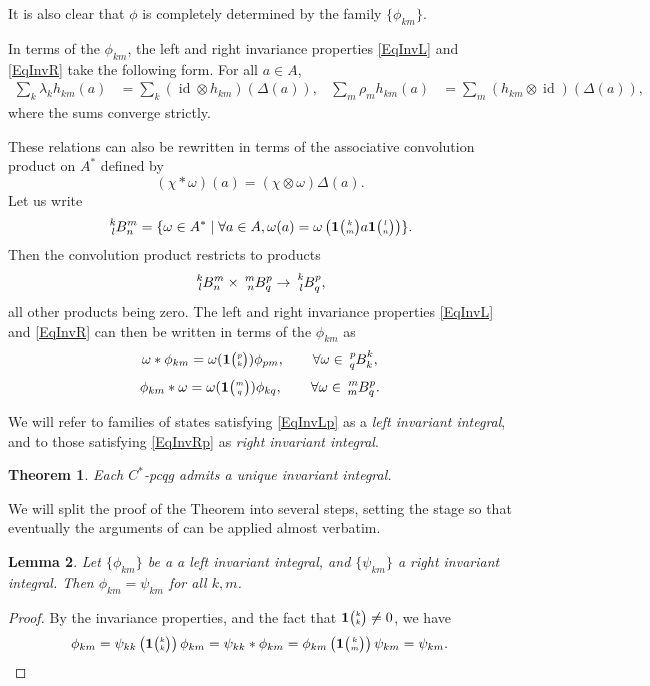 \documentclass[11pt]{article}
\DeclareMathOperator{\id}{id}
\newcommand{\Grt}[3]{#1{\tiny {\begin{pmatrix} #2\\#3\end{pmatrix}}}}
\newcommand{\UnitC}[2]{\Grt{\mathbf{1}}{#1}{#2}}
\newcommand{\Gr}[5]{\,\tensor*[^{#2}_{#4}]{#1}{^{#3}_{#5}}}%
\newtheorem{Theorem}{Theorem}[section]
\newtheorem{Lem}[Theorem]{Lemma}
\theoremstyle{definition}
\numberwithin{equation}{section}
\begin{document}
It is also clear that $\phi$ is completely determined by the family
$\{\phi_{km}\}$.  

In terms of the $\phi_{km}$, the left and right invariance properties
\eqref{EqInvL} and \eqref{EqInvR} take the following form.  For all
$a\in A$,
\begin{align} \label{eq:invariance}
\sum_{k}  \lambda_{k} h_{km}(a) &= \sum_{k}  (\id \otimes
h_{km})(\Delta(a)), &
\sum_{m} \rho_{m} h_{km}(a) &= \sum_{m} (h_{km} \otimes \id)(\Delta(a)),
\end{align}
where the sums converge strictly.

These relations can also  be rewritten in terms of the associative
convolution product on $A^*$  defined by \[(\chi*\omega)(a) =
(\chi\otimes \omega)\Delta(a).\] Let us write \[\Gr{B}{k}{m}{l}{n} = \{\omega \in A^* \mid \forall a\in A, \omega(a) = \omega\left(\UnitC{k}{m}a\UnitC{l}{n}\right)\}.\] Then the convolution product restricts to products \[\Gr{B}{k}{m}{l}{n}\times \Gr{B}{m}{p}{n}{q}\rightarrow \Gr{B}{k}{p}{l}{q},\] all other products being zero. The left and right invariance properties \eqref{EqInvL} and \eqref{EqInvR} can then be written in terms of the $\phi_{km}$ as \begin{equation}\label{EqInvLp}\omega*\phi_{km} = \omega(\UnitC{p}{k})\phi_{pm},\qquad \forall \omega \in \Gr{B}{p}{k}{q}{k},\end{equation}
\begin{equation}\label{EqInvRp}\phi_{km}*\omega = \omega(\UnitC{m}{q})\phi_{kq},\qquad \forall \omega \in \Gr{B}{m}{p}{m}{q}.\end{equation}


We will refer to families of states satisfying \eqref{EqInvLp} as a \emph{left invariant integral}, and to those satisfying \eqref{EqInvRp} as \emph{right invariant integral}.

\begin{Theorem}\label{TheoInvInt} Each $C^*$-pcqg admits a unique invariant integral.
\end{Theorem} 

We will split the proof of the Theorem into several steps, setting the stage so that eventually the arguments of \cite{MVD1} can be applied almost verbatim. 

\begin{Lem} Let $\{\phi_{km}\}$ be a a left invariant integral, and $\{\psi_{km}\}$ a right invariant integral. Then $\phi_{km}= \psi_{km}$ for all $k,m$. 
\end{Lem} 
\begin{proof} By the invariance properties, and the fact that $\UnitC{k}{k}\neq 0$, we have \[\phi_{km}  = \psi_{kk}\left(\UnitC{k}{k}\right)\phi_{km} = \psi_{kk}*\phi_{km}= \phi_{km}\left(\UnitC{k}{m}\right)\psi_{km} = \psi_{km}.\]

\end{proof} 
\end{document}
